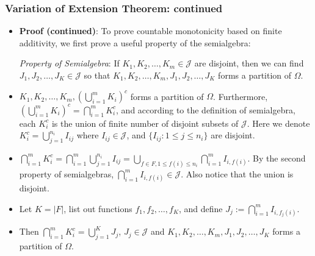 \documentclass[handout]{beamer}
\begin{document}
\frame
{
  \frametitle{Variation of Extension Theorem: continued}

   \begin{itemize}

       
              \item<1-> []\textbf{Proof (continued)}:  To prove countable monotonicity based on finite additivity, we first prove a useful property of the semialgebra:
              
              \textit{Property of Semialgebra}: If $K_1, K_2,\ldots, K_m \in\mathcal{J} $ are disjoint, then we can find $J_1, J_2,\ldots, J_K \in \mathcal{J}$ so that $K_1, K_2,\ldots, K_m, J_1, J_2,\ldots, J_K $ forms a partition of $\Omega$. 
              
                             \item<2->[-]  $K_1, K_2,\ldots, K_m, (\bigcup_{i=1}^m K_i)^c$ forms a partition of $\Omega$. Furthermore, $ (\bigcup_{i=1}^m K_i)^c= \bigcap_{i=1}^m K_i^c$, and according to the definition of semialgebra, each $K_i^c$ is the union of finite number of disjoint subsets of $\mathcal{J}$. Here we denote $K_i^c=\bigcup_{j=1}^{n_i} I_{ij}$ where $I_{ij} \in \mathcal{J}$,  and $\{I_{ij}: 1\leq j\leq n_i\}$ are disjoint. 
             
            
                 \item<3->[-]  $\bigcap_{i=1}^m K_i^c=\bigcap_{i=1}^m \bigcup_{j=1}^{n_i} I_{ij}= \bigcup_{f \in F, 1\leq f(i) \leq n_i} \bigcap_{i=1}^m  I_{i, f(i)}$. By the second property of semialgebras, $\bigcap_{i=1}^m I_{i, f(i)} \in \mathcal{J}$. Also notice that the union is disjoint. 

				\item<4->[-] Let $K = |F|$, list out functions $f_1, f_2, \ldots, f_K$, and define $J_j := \bigcap_{i=1}^m  I_{i, f_j(i)}$.
                     
                 \item<5->[-] Then $\bigcap_{i=1}^m K_i^c=\bigcup_{j=1}^K J_j$, $J_j \in \mathcal{J}$ and $K_1, K_2,\ldots, K_m, J_1, J_2,\ldots, J_K $ forms a partition of $\Omega$. 
                 
                \end{itemize}
}
\end{document}
